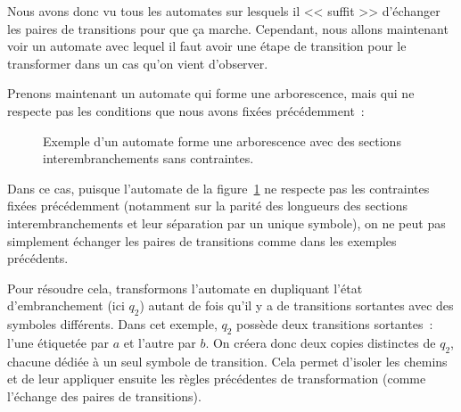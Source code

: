 Nous avons donc vu tous les automates sur lesquels il << suffit >> d'échanger
les paires de transitions pour que ça marche. Cependant, nous allons
maintenant voir un automate avec lequel il faut avoir une étape de transition
pour le transformer dans un cas qu'on vient d'observer.

\vphantom{}

Prenons maintenant un automate qui forme une arborescence, mais qui ne
respecte pas les conditions que nous avons fixées précédemment~:

\begin{figure}[H]
  \centering
  \captionsetup{type=figure,justification=centering}
  \caption{
    Exemple d’un automate forme une arborescence avec des sections
    interembranchements sans contraintes.
  }\label{fig:automate_arbre3}
\end{figure}

Dans ce cas, puisque l'automate de la figure~\ref{fig:automate_arbre3} ne
respecte pas les contraintes fixées précédemment (notamment sur la parité des
longueurs des sections interembranchements et leur séparation par un unique
symbole), on ne peut pas simplement échanger les paires de transitions comme
dans les exemples précédents.

\vphantom{}

Pour résoudre cela, transformons l’automate en dupliquant l’état
d’embranchement (ici \(q_2\)) autant de fois qu’il y a de transitions
sortantes avec des symboles différents. Dans cet exemple, \(q_2\) possède deux
transitions sortantes~: l'une étiquetée par \(a\) et l'autre par \(b\). On
créera donc deux copies distinctes de \(q_2\), chacune dédiée à un seul
symbole de transition. Cela permet d’isoler les chemins et de leur appliquer
ensuite les règles précédentes de transformation (comme l’échange des paires
de transitions).

